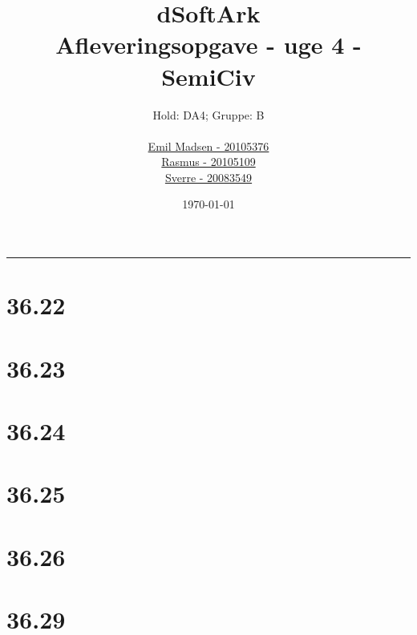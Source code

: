 \title{\huge dSoftArk \\
       \small Afleveringsopgave - uge 4 - SemiCiv}
\author{Hold: DA4; Gruppe: B\\ \\
        \href{mailto:skeen@cs.au.dk}{Emil Madsen - 20105376}\\
        \href{mailto:emray@cs.au.dk}{Rasmus - 20105109}\\
        \href{mailto:sverre@cs.au.dk}{Sverre - 20083549}
       }
\date{\today}

\maketitle

\hrule

\section*{ 36.22 }


\section*{ 36.23 }


\section*{ 36.24 }


\section*{ 36.25 }


\section*{ 36.26 }


\section*{ 36.29 }

